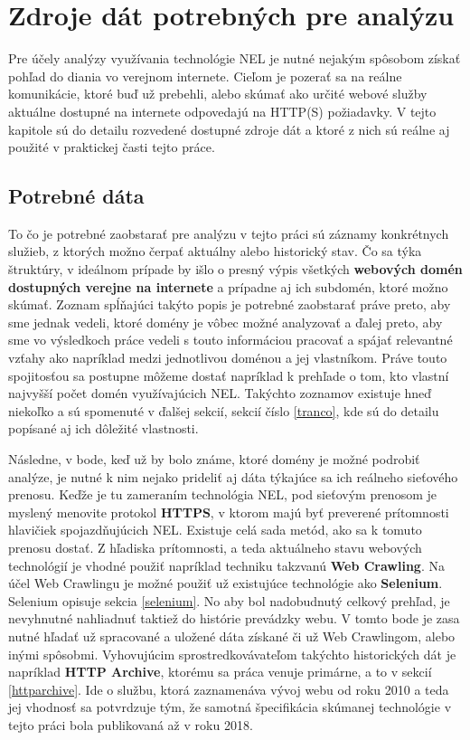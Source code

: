\chapter{Zdroje dát potrebných pre analýzu}
\label{data-sources-available-for-research}

Pre účely analýzy využívania technológie NEL je nutné nejakým spôsobom získať pohľad do diania vo verejnom internete.
Cieľom je pozerať sa na reálne komunikácie, ktoré buď už prebehli, alebo skúmať ako určité webové služby aktuálne dostupné na internete
odpovedajú na HTTP(S) požiadavky. V tejto kapitole sú do detailu rozvedené dostupné zdroje dát 
a ktoré z nich sú reálne aj použité v praktickej časti tejto práce. %

\section{Potrebné dáta}

To čo je potrebné zaobstarať pre analýzu v tejto práci sú záznamy konkrétnych služieb, z ktorých možno čerpať aktuálny alebo historický stav. Čo sa týka štruktúry, v ideálnom prípade by išlo o presný výpis všetkých \textbf{webových domén dostupných verejne na internete} a prípadne aj ich subdomén, ktoré možno skúmať. 
Zoznam spĺňajúci takýto popis je potrebné zaobstarať práve preto, aby sme jednak vedeli, ktoré domény je vôbec možné analyzovať a ďalej preto, aby sme vo výsledkoch práce vedeli s touto informáciou pracovať a spájať relevantné vzťahy ako napríklad medzi jednotlivou doménou a jej vlastníkom. 
Práve touto spojitosťou sa postupne môžeme dostať napríklad k prehľade o tom, kto vlastní najvyšší počet domén využívajúcich NEL. 
Takýchto zoznamov existuje hneď niekoľko a sú spomenuté v ďalšej sekcií, sekcií číslo \ref{tranco}, kde sú do detailu popísané aj ich dôležité vlastnosti.

Následne, v bode, keď už by bolo známe, ktoré domény je možné podrobiť analýze, je nutné k nim nejako prideliť aj dáta týkajúce sa ich reálneho sieťového prenosu. 
Keďže je tu zameraním technológia NEL, pod sieťovým prenosom je myslený menovite protokol \textbf{HTTPS}, v ktorom majú byť preverené prítomnosti hlavičiek spojazdňujúcich NEL. Existuje celá sada metód, ako sa k tomuto prenosu dostať. 
Z hľadiska prítomnosti, a teda aktuálneho stavu webových technológií je vhodné použiť napríklad techniku takzvanú \textbf{Web Crawling}.
Na účel Web Crawlingu je možné použiť už existujúce technológie ako \textbf{Selenium}. 
Selenium opisuje sekcia \ref{selenium}.
No aby bol nadobudnutý celkový prehľad, je nevyhnutné nahliadnuť taktiež do histórie prevádzky webu. 
V tomto bode je zasa nutné hľadať už spracované a uložené dáta získané či už Web Crawlingom, alebo inými spôsobmi. 
Vyhovujúcim sprostredkovávateľom takýchto historických dát je napríklad \textbf{HTTP Archive}, ktorému sa práca venuje primárne, a to v sekcií \ref{httparchive}.
Ide o službu, ktorá zaznamenáva vývoj webu od roku 2010 a teda jej vhodnosť sa potvrdzuje tým, že samotná špecifikácia skúmanej technológie v tejto práci bola publikovaná až v roku 2018.

